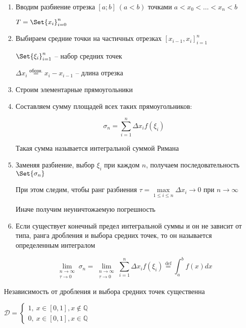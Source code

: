 \documentclass[12pt]{article}
\begin{document}
    \begin{enumerate}
        \item Вводим разбиение отрезка $[a; b]\ (a < b)$ точками $a < x_0 < \dots < x_n < b$

        $T = \Set{x_i}^n_{i=0}$

        \item Выбираем средние точки на частичных отрезках $[x_{i-1}, x_i]^n_{i=1}$

        $\Set{\xi_i}_{i=1}^n$ -- набор средних точек

        $\Delta x_i \stackrel{\text{обозн.}}{=} x_i - x_{i-1}$ -- длина отрезка

        \item Строим элементарные прямоугольники
        \item Составляем сумму площадей всех таких прямоугольников:

        \[\sigma_n = \sum^n_{i=1} \Delta x_i f(\xi_i)\]

        Такая сумма называется интегральной суммой Римана

        \item Заменяя разбиение, выбор $\xi_i$ при каждом $n$, получаем последовательность $\Set{\sigma_n}$

        При этом следим, чтобы ранг разбиения $\tau = \max\limits_{1 \leq i \leq n} \Delta x_i \rightarrow 0$ при $n \to \infty$

        Иначе получим неуничтожаемую погрешность

        \item \Def \hypertarget{integraldefinition}{Если существует конечный предел интегральной суммы} и он не зависит от типа,
        ранга дробления и выбора средних точек, то он называется определенным интегралом

        \[\lim_{\substack{n\to\infty \\ \tau\to0}} \sigma_n = \lim_{\substack{n\to\infty \\ \tau\to0}} \sum^n_{i=1} \Delta x_i f(\xi_i) \stackrel{\text{def}}{=} \int_a^b f(x)dx\]

    \end{enumerate}

    \Nota Независимость от дробления и выбора средних точек существенна

    \Ex $\mathcal{D} = \begin{cases}
                           1,\ x \in [0, 1], x \not\in \mathbb{Q} \\ 0,\ x \in [0, 1], x \in \mathbb{Q}
    \end{cases}$
\end{document}
